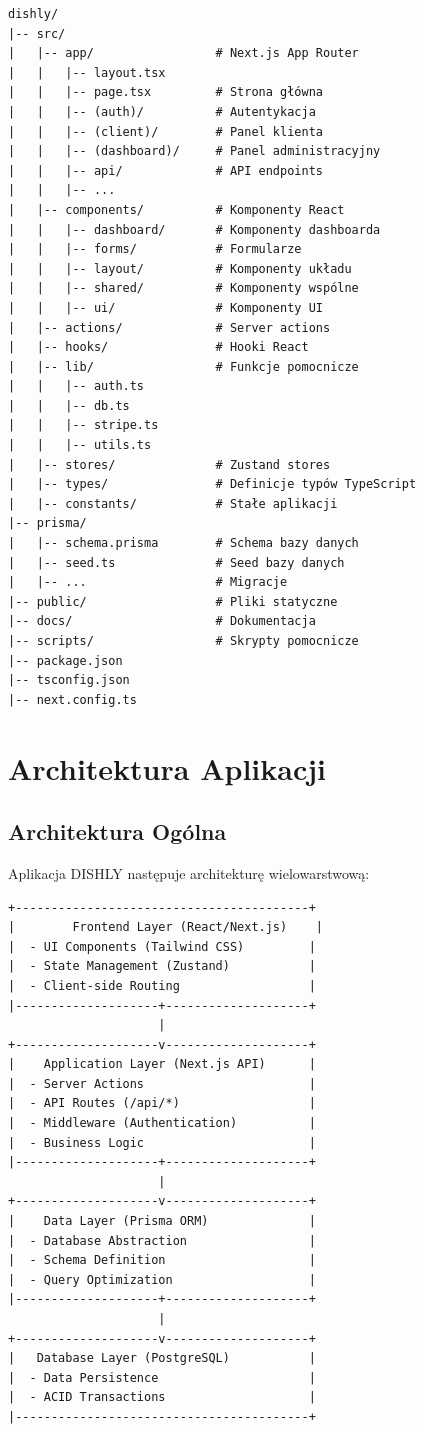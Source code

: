 \documentclass[12pt,a4paper,utf-8]{article}
\begin{document}
\begin{verbatim}
dishly/
|-- src/
|   |-- app/                 # Next.js App Router
|   |   |-- layout.tsx
|   |   |-- page.tsx         # Strona główna
|   |   |-- (auth)/          # Autentykacja
|   |   |-- (client)/        # Panel klienta
|   |   |-- (dashboard)/     # Panel administracyjny
|   |   |-- api/             # API endpoints
|   |   |-- ...
|   |-- components/          # Komponenty React
|   |   |-- dashboard/       # Komponenty dashboarda
|   |   |-- forms/           # Formularze
|   |   |-- layout/          # Komponenty układu
|   |   |-- shared/          # Komponenty wspólne
|   |   |-- ui/              # Komponenty UI
|   |-- actions/             # Server actions
|   |-- hooks/               # Hooki React
|   |-- lib/                 # Funkcje pomocnicze
|   |   |-- auth.ts
|   |   |-- db.ts
|   |   |-- stripe.ts
|   |   |-- utils.ts
|   |-- stores/              # Zustand stores
|   |-- types/               # Definicje typów TypeScript
|   |-- constants/           # Stałe aplikacji
|-- prisma/
|   |-- schema.prisma        # Schema bazy danych
|   |-- seed.ts              # Seed bazy danych
|   |-- ...                  # Migracje
|-- public/                  # Pliki statyczne
|-- docs/                    # Dokumentacja
|-- scripts/                 # Skrypty pomocnicze
|-- package.json
|-- tsconfig.json
|-- next.config.ts
\end{verbatim}

\newpage

\section{Architektura Aplikacji}

\subsection{Architektura Ogólna}

Aplikacja DISHLY następuje architekturę wielowarstwową:

\begin{verbatim}
+-----------------------------------------+
|        Frontend Layer (React/Next.js)    |
|  - UI Components (Tailwind CSS)         |
|  - State Management (Zustand)           |
|  - Client-side Routing                  |
|--------------------+--------------------+
                     |
+--------------------v--------------------+
|    Application Layer (Next.js API)      |
|  - Server Actions                       |
|  - API Routes (/api/*)                  |
|  - Middleware (Authentication)          |
|  - Business Logic                       |
|--------------------+--------------------+
                     |
+--------------------v--------------------+
|    Data Layer (Prisma ORM)              |
|  - Database Abstraction                 |
|  - Schema Definition                    |
|  - Query Optimization                   |
|--------------------+--------------------+
                     |
+--------------------v--------------------+
|   Database Layer (PostgreSQL)           |
|  - Data Persistence                     |
|  - ACID Transactions                    |
|-----------------------------------------+
\end{verbatim}
\end{document}
